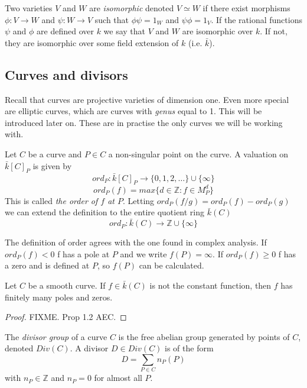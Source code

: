 \begin{mydef}
 Two varieties $V$ and $W$ are \emph{isomorphic} denoted $V\simeq W$
if there exist morphisms $\phi: V \rightarrow W$ and $\psi: W \rightarrow V$ such that
$\phi \psi = 1_W$ and $\psi \phi = 1_V$.
If the rational functions $\psi$ and $\phi$ are defined over $k$ we say that $V$ and $W$
are isomorphic over $k$. If not, they are isomorphic over some field extension of $k$
(i.e. $\bar{k}$).
\end{mydef}


\subsection{Curves and divisors}
Recall that curves are projective varieties of dimension one. Even more special
are elliptic curves, which are curves with \emph{genus} equal to 1. This will
be introduced later on. These are in practise the only curves we will be working with.

\begin{mydef}
 Let $C$ be a curve and $P\in C$ a non-singular point on the curve. A valuation on
$\bar{k}[C]_P$ is given by
$$ ord_P : \bar{k}[C]_P \rightarrow \{ 0, 1, 2, \ldots \} \cup \{ \infty \} $$
$$ ord_P(f) = max \{ d\in \mathbb{Z} : f\in M_P^d \} $$
This is called \emph{the order of $f$ at $P$}.
Letting $ord_P(f/g) = ord_P(f) - ord_P(g)$ we can extend the definition to the entire
quotient ring $\bar{k}(C)$
$$ ord_P: \bar{k}(C) \rightarrow \mathbb{Z}\cup \{\infty \} $$
\end{mydef}

The definition of order agrees with the one found in complex analysis.
If $ord_P(f) < 0$ f has a pole at $P$ and we write $f(P)=\infty$. 
If $ord_P(f) \ge 0$ f has a zero and is defined at $P$, so $f(P)$ can be calculated. 

\begin{prop}
 Let $C$ be a smooth curve. If $f\in \bar{k}(C)$ is not the constant function, then
$f$ has finitely many poles and zeros.
\label{prop:1}
\end{prop}
\begin{proof}
 FIXME. Prop 1.2 AEC.
\end{proof}

\begin{mydef}
 The \emph{divisor group} of a curve $C$ is the free abelian group generated by
points of $C$, denoted $Div(C)$. A divisor $D\in Div(C)$ is of the form
$$ D = \sum_{P\in C} n_P(P)$$
with $n_P\in\mathbb{Z}$ and $n_P = 0$ for almost all $P$.
\end{mydef}

